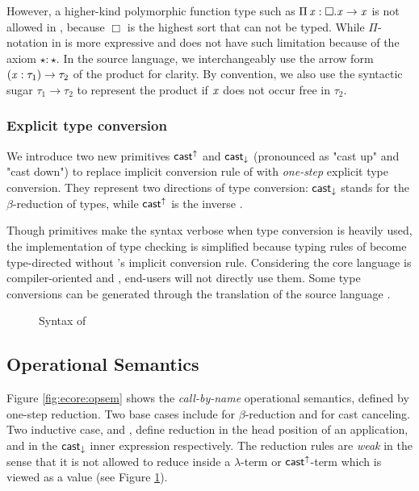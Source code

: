 However, a higher-kind polymorphic function type such as $\Pi \, \mathit{x}  :  \Box  .  \mathit{x}  \rightarrow  \mathit{x}$ is not allowed in \cc, because $\Box$ is the highest sort that can not be typed. While $ \Pi $-notation in \ecore is more expressive and does not have such limitation because of the axiom $\star:\star$. In the source language, we interchangeably use the arrow form $(  \mathit{x}  :  \tau_{{\mathrm{1}}}  )  \rightarrow  \tau_{{\mathrm{2}}}$ of the product for clarity. By convention, we also use the syntactic sugar $\tau_{{\mathrm{1}}}  \longrightarrow  \tau_{{\mathrm{2}}}$ to represent the product if $\mathit{x}$ does not occur free in $\tau_{{\mathrm{2}}}$.

\subsubsection{Explicit type conversion}
We introduce two new primitives $ \mathsf{cast}^{\uparrow} $ and $ \mathsf{cast}_{\downarrow} $ (pronounced as "cast up" and "cast down") to replace implicit conversion rule of \cc with \emph{one-step} explicit type conversion. They represent two directions of type conversion: $ \mathsf{cast}_{\downarrow} $ stands for the $\beta$-reduction of types, while $ \mathsf{cast}^{\uparrow} $ is the inverse .

Though \cast primitives make the syntax verbose when type conversion is heavily used, the implementation of type checking is simplified because typing rules of \ecore become type-directed without \cc's implicit conversion rule. Considering the core language is compiler-oriented and , end-users will not directly use them. Some type conversions can be generated through the translation of the source language \fixme{(\S \ref{sec:src})}.

\begin{figure}
    \gram{\ottec\ottinterrule
        \ottG\ottinterrule
        \ottv}
    \caption{Syntax of \ecore}
    \label{fig:ecore:syntax}
\end{figure}

\subsection{Operational Semantics}\label{sec:ecore:opsem}
Figure \ref{fig:ecore:opsem} shows the \emph{call-by-name} operational semantics, defined by one-step reduction. Two base cases include  for $\beta$-reduction and  for cast canceling. Two inductive case,  and , define reduction in the head position of an application, and in the $ \mathsf{cast}_{\downarrow} $ inner expression respectively. The reduction rules are \emph{weak} in the sense that it is not allowed to reduce inside a $\lambda$-term or $ \mathsf{cast}^{\uparrow} $-term which is viewed as a value (see Figure \ref{fig:ecore:syntax}).

